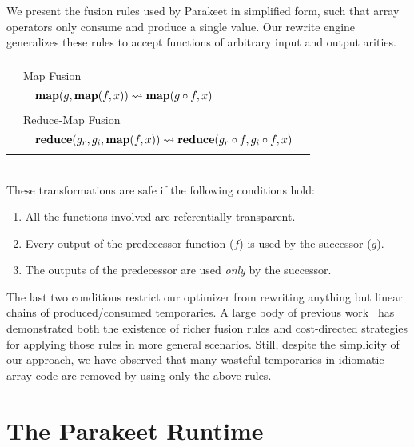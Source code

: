 \documentclass[10pt,twocolumn]{article}
\begin{document}
We present the fusion rules used by Parakeet in simplified form, such that array operators only consume and produce a single value. Our rewrite engine generalizes these rules to accept functions of arbitrary input and output arities.
\\[5pt]
\begin{tabular}{|m{0.001cm} m{0.05cm} p{6.75cm} p{0.05cm} |}
  \hline 
  & &  & \\
  & \multicolumn{2}{l}{\large{Map Fusion} }  &  \\[2.5pt]
  & & $\mbox{\textbf{map}}(g, \mbox{\textbf{map}}(f, x)) \leadsto \mbox{\textbf{map}}(g \circ f, x)$ & \\
  & & & \\
  & \multicolumn{2}{l}{\large{Reduce-Map Fusion} }  & \\[2.5pt]
  & & $\mbox{\textbf{reduce}}(g_r, g_{i}, \mbox{\textbf{map}}(f, x)) \leadsto \mbox{\textbf{reduce}}(g_r \circ f, g_{i} \circ f, x)$ & \\
  & & & \\
  \hline
\end{tabular}\\[4pt]

These transformations are safe if the following conditions hold:
\begin{enumerate}
\item All the functions involved are referentially transparent.

\item Every output of the predecessor function ($f$) is used by the successor
($g$).

\item The outputs of the predecessor are used \textit{only} by the successor.
\end{enumerate}

The last two conditions restrict our optimizer from rewriting anything but linear chains of produced/consumed temporaries. A large body of previous work~\cite{Ald01} has demonstrated both the existence of richer fusion rules and cost-directed strategies for applying those rules in more general scenarios. Still, despite the simplicity of our approach, we have observed that many wasteful temporaries in idiomatic array code are removed by using only the above rules.



\section{The Parakeet Runtime}
\label{runtime}
\end{document}
